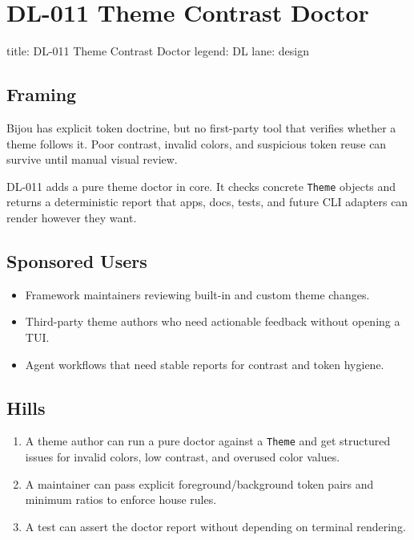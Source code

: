 \chapter{DL-011 Theme Contrast Doctor}\label{record-176}

\smallskip

\begin{RecordMeta}
title: DL-011 Theme Contrast Doctor
legend: DL
lane: design

\end{RecordMeta}

\section{Framing}\label{record-176-framing}

Bijou has explicit token doctrine, but no first-party tool that verifies whether a theme follows it. Poor contrast, invalid colors, and suspicious token reuse can survive until manual visual review.

DL-011 adds a pure theme doctor in core. It checks concrete \texttt{T\allowbreak{}h\allowbreak{}e\allowbreak{}m\allowbreak{}e} objects and returns a deterministic report that apps, docs, tests, and future CLI adapters can render however they want.

\section{Sponsored Users}\label{record-176-sponsored-users}

\begin{itemize}
\tightlist
\item
  Framework maintainers reviewing built-in and custom theme changes.
\item
  Third-party theme authors who need actionable feedback without opening a TUI.
\item
  Agent workflows that need stable reports for contrast and token hygiene.
\end{itemize}

\section{Hills}\label{record-176-hills}

\begin{enumerate}
\def\labelenumi{\arabic{enumi}.}
\tightlist
\item
  A theme author can run a pure doctor against a \texttt{T\allowbreak{}h\allowbreak{}e\allowbreak{}m\allowbreak{}e} and get structured issues for invalid colors, low contrast, and overused color values.
\item
  A maintainer can pass explicit foreground/background token pairs and minimum ratios to enforce house rules.
\item
  A test can assert the doctor report without depending on terminal rendering.
\end{enumerate}

